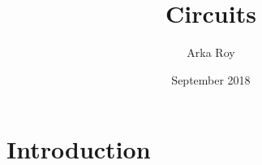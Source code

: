 \documentclass{article}
\title{Circuits}
\author{Arka Roy}
\date{September 2018}
\begin{document}
\maketitle

\section{Introduction}
\end{document}
